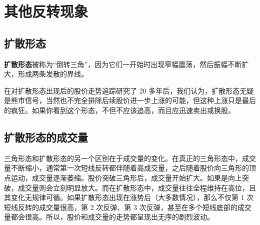 \chapter{其他反转现象}
\section{扩散形态}
\textbf{扩散形态}被称为“倒转三角”，因为它们一开始时出现窄幅震荡，然后振幅不断扩大，形成两条发散的界线。

在对扩散形态出现后的股价走势追踪研究了 20 多年后，我们认为，扩散形态无疑是熊市信号，当然也不完全排除后续股价进一步上涨的可能，但这种上涨只是最后的疯狂。如果你看到这个形态，不但不应该追高，而且应迅速卖出或换股。
\section{扩散形态的成交量}
三角形态和扩散形态的另一个区别在于成交量的变化。在真正的三角形态中，成交量不断缩小，通常第一次短线反转都伴随着高成交量，之后随着股价向三角形的顶点运动，成交量逐渐萎缩。股价突破三角形后，成交量开始扩大。如果是向上突破，成交量则会立刻明显放大。而在扩散形态中，成交量往往全程维持在高位，且其变化无规律可循。如果扩散形态出现在涨势后（大多数情况），那么不仅第 1 次短线反转的成交量很高，第 2 次反弹、第 3 次反弹，甚至在多个短线底部的成交量都会很高。所以，股价和成交量的走势都呈现出无序的剧烈波动。